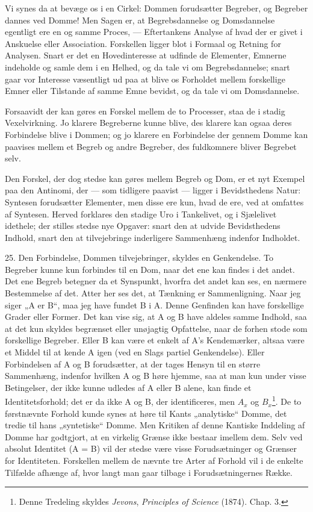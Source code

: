 \documentclass[12pt,a4paper]{book}
\newcommand{\apage}[1]{\marginnote{\footnotesize\textit{[#1]}}}
\begin{document}
Vi synes da at bevæge os i en Cirkel: Dommen forudsætter Begreber, og
Begreber dannes ved Domme! Men Sagen er, at Begrebsdannelse og
Domsdannelse egentligt ere en og samme Proces, --- Eftertankens Analyse
af hvad der er givet i Anskuelse eller Association. Forskellen ligger
blot i Formaal og Retning for Analysen. Snart er det en Hovedinteresse
at udfinde de Elementer, Emnerne indeholde og samle dem i en Helhed, og
da tale vi om Begrebsdannelse; snart gaar vor Interesse væsentligt ud
paa at blive os Forholdet mellem forskellige Emner eller Tilstande af
samme Emne bevidst, og da tale vi om Domsdannelse.

Forsaavidt der kan gøres en Forskel mellem de to Processer, staa de i
stadig Vexelvirkning. Jo klarere Begreberne kunne blive, des klarere kan
ogsaa deres Forbindelse blive i Dommen; og jo klarere en Forbindelse der
gennem Domme kan paavises mellem et Begreb og andre Begreber, des
fuldkomnere bliver Begrebet selv.

Den Forskel, der dog stedse kan gøres mellem Begreb og \apage{73} Dom, er et nyt
Exempel paa den Antinomi, der --- som tidligere paavist --- ligger i
Bevidsthedens Natur: Syntesen forudsætter Elementer, men disse ere kun,
hvad de ere, ved at omfattes af Syntesen. Herved forklares den stadige
Uro i Tankelivet, og i Sjælelivet idethele; der stilles stedse nye
Opgaver: snart den at udvide Bevidsthedens Indhold, snart den at
tilvejebringe inderligere Sammenhæng indenfor Indholdet.

25. Den Forbindelse, Dommen tilvejebringer, skyldes en Genkendelse. To
Begreber kunne kun forbindes til en Dom, naar det ene kan findes i det
andet. Det ene Begreb betegner da et Synspunkt, hvorfra det andet kan
ses, en nærmere Bestemmelse af det. Atter her ses det, at Tænkning er
Sammenligning. Naar jeg siger „A er B“, maa jeg have fundet B i A. Denne
Genfinden kan have forskellige Grader eller Former. Det kan vise sig, at
A og B have aldeles samme Indhold, saa at det kun skyldes begrænset
eller unøjagtig Opfattelse, naar de forhen stode som forskellige
Begreber. Eller B kan være et enkelt af A’s Kendemærker, altsaa være et
Middel til at kende A igen (ved en Slags partiel Genkendelse). Eller
Forbindelsen af A og B forudsætter, at der tages Hensyn til en større
Sammenhæng, indenfor hvilken A og B høre hjemme, saa at man kun under
visse Betingelser, der ikke kunne udledes af A eller B alene, kan finde
et Identitetsforhold; det er da ikke A og B, der identificeres, men
$A_x$ og $B_x$\footnote{Denne Tredeling skyldes \emph{Jevons},
\emph{Principles of Science} (1874). Chap. 3.}. De to førstnævnte
Forhold kunde synes at høre til Kants „analytiske“ Domme, det tredie til
hans „syntetiske“ Domme. Men Kritiken af denne Kantiske Inddeling af
Domme har godtgjort, at en virkelig Grænse ikke bestaar imellem dem.
Selv ved absolut Identitet (A = B) vil der stedse være visse
Forudsætninger og Grænser for Identiteten. Forskellen mellem de nævnte
tre Arter af Forhold vil i de enkelte Tilfælde afhænge af, hvor langt
man gaar tilbage i Forudsætningernes Række.
\end{document}

